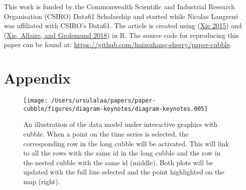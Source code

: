 \documentclass{article}
\begin{document}
This work is funded by the Commonwealth Scientific and Industrial Research Organisation (CSIRO) Data61 Scholarship and started while Nicolas Langrené was affiliated with CSIRO's Data61. The article is created using  (\protect\hyperlink{ref-knitr}{Xie 2015}) and  (\protect\hyperlink{ref-rmarkdown}{Xie, Allaire, and Grolemund 2018}) in R. The source code for reproducing this paper can be found at: \url{https://github.com/huizezhang-sherry/paper-cubble}.

\hypertarget{appendix}{%
\section{Appendix}\label{appendix}}

\begin{figure}

{\centering \texttt{[image: /Users/ursulalaa/papers/paper-cubble/figures/diagram-keynotes/diagram-keynotes.005]} 

}

\caption{An illustration of the data model under interactive graphics with cubble. When a point on the time series is selected, the corresponding row in the long cubble will be activated. This will link to all the rows with the same id in the long cubble and the row in the nested cubble with the same id (middle). Both plots will be updated with the full line selected and the point highlighted on the map (right).}\label{fig:illu-interactive-2}
\end{figure}

\newpage
\end{document}
